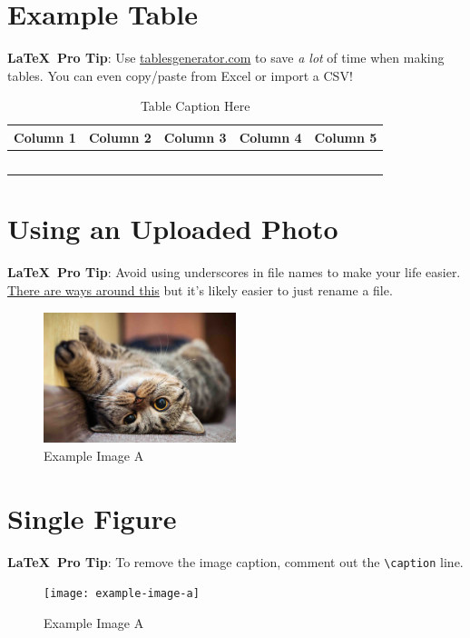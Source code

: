 \documentclass[letter]{amsart}
\begin{document}
\section*{Example Table}
\textbf{\LaTeX\ Pro Tip}: Use \href{https://tablesgenerator.com/}{tablesgenerator.com} to save \textit{a lot} of time when making tables.  You can even copy/paste from Excel or import a CSV!
\begin{table}[H]
\begin{tabular}{|c|c|c|c|c|}
\hline
\rowcolor[HTML]{333333} 
{\color[HTML]{FFFFFF} \textbf{Column 1}} &
  {\color[HTML]{FFFFFF} \textbf{Column 2}} &
  {\color[HTML]{FFFFFF} \textbf{Column 3}} &
  {\color[HTML]{FFFFFF} \textbf{Column 4}} &
  {\color[HTML]{FFFFFF} \textbf{Column 5}} \\ \hline
 &  &  &  &  \\ \hline
 &  &  &  &  \\ \hline
 &  &  &  &  \\ \hline
 &  &  &  &  \\ \hline
 &  &  &  &  \\ \hline
\end{tabular}
\caption{Table Caption Here}
\end{table}
\newpage

\section*{Using an Uploaded Photo}
\textbf{\LaTeX\ Pro Tip}: Avoid using underscores in file names to make your life easier.  \href{https://tex.stackexchange.com/questions/58689/how-to-use-an-underscore-in-a-filename}{There are ways around this} but it's likely easier to just rename a file.
\begin{figure}[H]
    \centering
    \includegraphics[width=0.5\textwidth]{cute-kitten.jpg}
    \caption{Example Image A}
\end{figure}
\newpage

\section*{Single Figure}
\textbf{\LaTeX\ Pro Tip}: To remove the image caption, comment out the \verb!\caption! line.
\begin{figure}[H]
    \centering
    \texttt{[image: example-image-a]}
    \caption{Example Image A}
\end{figure}
\newpage
\end{document}
